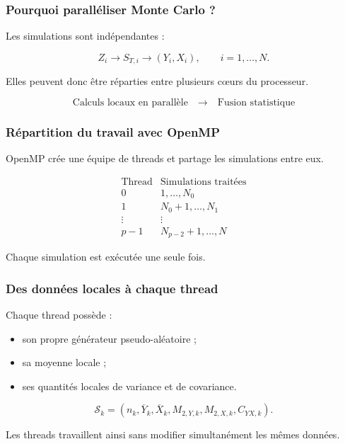 \documentclass[aspectratio=169,11pt]{beamer}
\begin{document}
\begin{frame}
    \frametitle{Pourquoi paralléliser Monte Carlo ?}

    Les simulations sont indépendantes :

    \[
        Z_i \longrightarrow S_{T,i} \longrightarrow (Y_i,X_i),
        \qquad i=1,\ldots,N.
    \]

    \vspace{0.4cm}

    Elles peuvent donc être réparties entre plusieurs c\oe{}urs du processeur.

    \vspace{0.4cm}

    \[
        \boxed{
        \text{Calculs locaux en parallèle}
        \quad\longrightarrow\quad
        \text{Fusion statistique}
        }
    \]
\end{frame}

\begin{frame}
    \frametitle{Répartition du travail avec OpenMP}

    OpenMP crée une équipe de threads et partage les simulations entre eux.

    \vspace{0.4cm}

    \[
    \begin{array}{c|c}
        \text{Thread} & \text{Simulations traitées} \\
        \hline
        0 & 1,\ldots,N_0 \\
        1 & N_0+1,\ldots,N_1 \\
        \vdots & \vdots \\
        p-1 & N_{p-2}+1,\ldots,N
    \end{array}
    \]

    \vspace{0.4cm}

    Chaque simulation est exécutée une seule fois.
\end{frame}

\begin{frame}
    \frametitle{Des données locales à chaque thread}

    Chaque thread possède :

    \begin{itemize}
        \item son propre générateur pseudo-aléatoire ;
        \item sa moyenne locale ;
        \item ses quantités locales de variance et de covariance.
    \end{itemize}

    \vspace{0.4cm}

    \[
        \mathcal{S}_k
        =
        \left(n_k,\overline{Y}_k,\overline{X}_k,
        M_{2,Y,k},M_{2,X,k},C_{YX,k}\right).
    \]

    Les threads travaillent ainsi sans modifier simultanément les mêmes données.
\end{frame}
\end{document}
